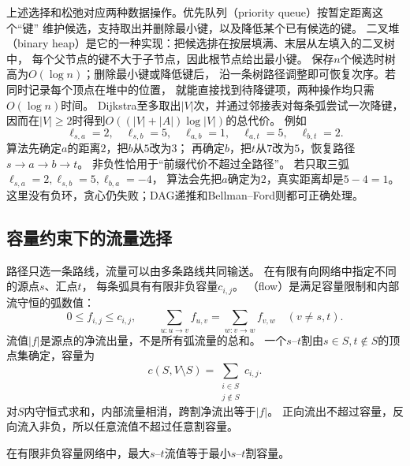 上述选择和松弛对应两种数据操作。优先队列（priority queue）按暂定距离这个“键”
维护候选，支持取出并删除最小键，以及降低某个已有候选的键。
二叉堆（binary heap）是它的一种实现：把候选排在按层填满、末层从左填入的二叉树中，
每个父节点的键不大于子节点，因此根节点给出最小键。
保存\(n\)个候选时树高为\(O(\log n)\)；删除最小键或降低键后，
沿一条树路径调整即可恢复次序。若同时记录每个顶点在堆中的位置，
就能直接找到待降键项，两种操作均只需\(O(\log n)\)时间。
Dijkstra至多取出\(|V|\)次，并通过邻接表对每条弧尝试一次降键，
因而在\(|V|\geq2\)时得到\(O((|V|+|A|)\log|V|)\)的总代价。
例如
\[
  \ell_{s,a}=2,\quad\ell_{s,b}=5,\quad\ell_{a,b}=1,\quad
  \ell_{a,t}=5,\quad\ell_{b,t}=2.
\]
算法先确定\(a\)的距离\(2\)，把\(b\)从\(5\)改为\(3\)；
再确定\(b\)，把\(t\)从\(7\)改为\(5\)，恢复路径\(s\to a\to b\to t\)。
非负性恰用于“前缀代价不超过全路径”。
若只取三弧\(\ell_{s,a}=2,\ell_{s,b}=5,\ell_{b,a}=-4\)，
算法会先把\(a\)确定为\(2\)，真实距离却是\(5-4=1\)。
这里没有负环，贪心仍失败；DAG递推和Bellman--Ford则都可正确处理。

\subsection{容量约束下的流量选择}

路径只选一条路线，流量可以由多条路线共同输送。
在有限有向网络中指定不同的源点\(s\)、汇点\(t\)，
每条弧具有有限非负容量\(c_{i,j}\)。
（flow）是满足容量限制和内部流守恒的弧数值：
\[
  0\leq f_{i,j}\leq c_{i,j},\qquad
  \sum_{u:u\to v}f_{u,v}
  =\sum_{w:v\to w}f_{v,w}\quad(v\neq s,t).
\]
流值\(|f|\)是源点的净流出量，不是所有弧流量的总和。
一个\(s\)--\(t\)割由\(s\in S,t\notin S\)的顶点集确定，容量为
\[
  c(S,V\setminus S)=\sum_{\substack{i\in S\\j\notin S}}c_{i,j}.
\]
对\(S\)内守恒式求和，内部流量相消，跨割净流出等于\(|f|\)。
正向流出不超过容量，反向流入非负，所以任意流值不超过任意割容量。

\begin{theorem}[最大流最小割定理]
  \label{thm:graph-theory-max-flow-min-cut}
  在有限非负容量网络中，最大\(s\)--\(t\)流值等于最小\(s\)--\(t\)割容量。
\end{theorem}


